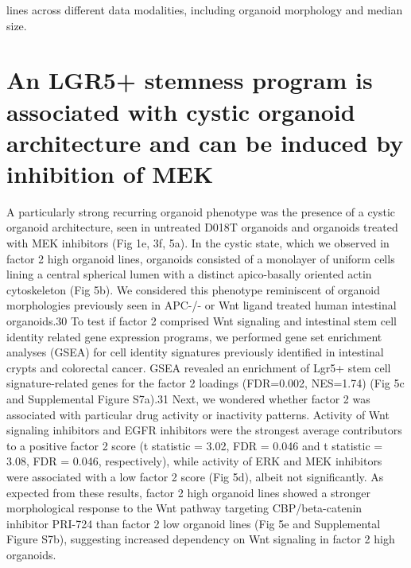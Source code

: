 \begin{flushleft}
lines across different data modalities, including organoid morphology and median size. 

\section{An LGR5+ stemness program is associated with cystic organoid architecture and can be induced by inhibition of MEK}

A particularly strong recurring organoid phenotype was the presence of a cystic organoid architecture, seen in untreated D018T organoids and organoids treated with MEK inhibitors (Fig 1e, 3f, 5a). In the cystic state, which we observed in factor 2 high organoid lines, organoids consisted of a monolayer of uniform cells lining a central spherical lumen with a distinct apico-basally oriented actin cytoskeleton (Fig 5b). We considered this phenotype reminiscent of organoid morphologies previously seen in APC-/- or Wnt ligand treated human intestinal organoids​​.30 To test if factor 2 comprised Wnt signaling and intestinal stem cell identity related gene expression programs, we performed gene set enrichment analyses (GSEA) for cell identity signatures previously identified in intestinal crypts and colorectal cancer. GSEA revealed an enrichment of Lgr5+ stem cell signature-related genes for the factor 2 loadings (FDR=0.002, NES=1.74) (Fig 5c and Supplemental Figure S7a).31 Next, we wondered whether factor 2 was associated with particular drug activity or inactivity patterns. Activity of Wnt signaling inhibitors and EGFR inhibitors were the strongest average contributors to a positive factor 2 score (t statistic = 3.02, FDR = 0.046 and t statistic = 3.08, FDR = 0.046, respectively), while activity of ERK and MEK inhibitors were associated with a low factor 2 score (Fig 5d), albeit not significantly. As expected from these results, factor 2 high organoid lines showed a stronger morphological response to the Wnt pathway targeting CBP/beta-catenin inhibitor PRI-724 than factor 2 low organoid lines (Fig 5e and Supplemental Figure S7b), suggesting increased dependency on Wnt signaling in factor 2 high organoids. 

\end{flushleft}

